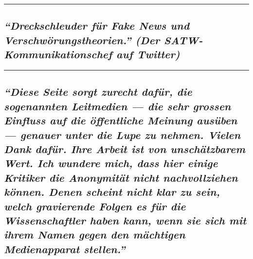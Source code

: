 \begin{center}\rule{0.5\linewidth}{\linethickness}\end{center}

\hypertarget{dreckschleuder-fuxfcr-fake-news-und-verschwuxf6rungstheorien-der-satw-kommunikationschef-auf-twitter}{%
\subsection{\texorpdfstring{\emph{``Dreckschleuder für Fake News und
Verschwörungs­theorien.'' (Der SATW-Kommunikationschef auf
Twitter)}}{``Dreckschleuder für Fake News und Verschwörungs­theorien.'' (Der SATW-Kommunikationschef auf Twitter)}}\label{dreckschleuder-fuxfcr-fake-news-und-verschwuxf6rungstheorien-der-satw-kommunikationschef-auf-twitter}}

\begin{center}\rule{0.5\linewidth}{\linethickness}\end{center}

\hypertarget{diese-seite-sorgt-zurecht-dafuxfcr-die-sogenannten-leitmedien--die-sehr-grossen-einfluss-auf-die-uxf6ffentliche-meinung-ausuxfcben--genauer-unter-die-lupe-zu-nehmen-vielen-dank-dafuxfcr-ihre-arbeit-ist-von-unschuxe4tzbarem-wert-ich-wundere-mich-dass-hier-einige-kritiker-die-anonymituxe4t-nicht-nachvollziehen-kuxf6nnen-denen-scheint-nicht-klar-zu-sein-welch-gravierende-folgen-es-fuxfcr-die-wissenschaftler-haben-kann-wenn-sie-sich-mit-ihrem-namen-gegen-den-muxe4chtigen-medienapparat-stellen}{%
\subsection{\texorpdfstring{\emph{``Diese Seite sorgt zurecht dafür, die
sogenannten Leitmedien --- die sehr grossen Einfluss auf die öffentliche
Meinung ausüben --- genauer unter die Lupe zu nehmen. Vielen Dank dafür.
Ihre Arbeit ist von unschätzbarem Wert. Ich wundere mich, dass hier
einige Kritiker die Anonymität nicht nachvollziehen können. Denen
scheint nicht klar zu sein, welch gravierende Folgen es für die
Wissenschaftler haben kann, wenn sie sich mit ihrem Namen gegen den
mächtigen Medienapparat
stellen.''}}{``Diese Seite sorgt zurecht dafür, die sogenannten Leitmedien --- die sehr grossen Einfluss auf die öffentliche Meinung ausüben --- genauer unter die Lupe zu nehmen. Vielen Dank dafür. Ihre Arbeit ist von unschätzbarem Wert. Ich wundere mich, dass hier einige Kritiker die Anonymität nicht nachvollziehen können. Denen scheint nicht klar zu sein, welch gravierende Folgen es für die Wissenschaftler haben kann, wenn sie sich mit ihrem Namen gegen den mächtigen Medienapparat stellen.''}}\label{diese-seite-sorgt-zurecht-dafuxfcr-die-sogenannten-leitmedien--die-sehr-grossen-einfluss-auf-die-uxf6ffentliche-meinung-ausuxfcben--genauer-unter-die-lupe-zu-nehmen-vielen-dank-dafuxfcr-ihre-arbeit-ist-von-unschuxe4tzbarem-wert-ich-wundere-mich-dass-hier-einige-kritiker-die-anonymituxe4t-nicht-nachvollziehen-kuxf6nnen-denen-scheint-nicht-klar-zu-sein-welch-gravierende-folgen-es-fuxfcr-die-wissenschaftler-haben-kann-wenn-sie-sich-mit-ihrem-namen-gegen-den-muxe4chtigen-medienapparat-stellen}}

